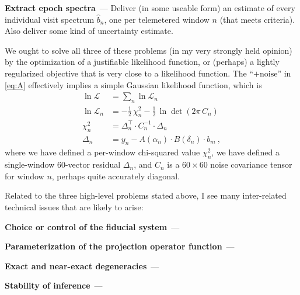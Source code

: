 \documentclass[11pt]{article}
\renewcommand{\paragraph}[1]{\medskip\par\noindent\textbf{#1}~---}
\begin{document}
\paragraph{Extract epoch spectra}
Deliver (in some useable form) an estimate of every individual visit spectrum $\hat{b}_n$, one per telemetered window $n$ (that meets criteria). Also deliver some kind of uncertainty estimate.

\medskip

We ought to solve all three of these problems (in my very strongly held opinion) by the optimization of a justifiable likelihood function, or (perhaps) a lightly regularized objective that is very close to a likelihood function.
The ``$+\mbox{noise}$'' in \eqref{eq:A} effectively implies a simple Gaussian likelihood function, which is
\begin{align}
    \ln\mathscr{L} &= \sum_n \ln\mathscr{L}_n \\
    \ln\mathscr{L}_n &= -\frac{1}{2}\,\chi^2_n - \frac{1}{2}\,\ln\det(2\pi\,C_n)\\
    \chi^2_n &= \Delta_n^\top\cdot C_n^{-1}\cdot \Delta_n \\
    \Delta_n &= y_n - A(\alpha_n)\cdot B(\delta_n)\cdot b_m ~,
\end{align}
where we have defined a per-window chi-squared value $\chi^2_n$,
we have defined a single-window 60-vector residual $\Delta_n$,
and $C_n$ is a $60\times 60$ noise covariance tensor for window $n$, perhaps quite accurately diagonal.

Related to the three high-level problems stated above, I see many inter-related technical issues that are likely to arise:

\paragraph{Choice or control of the fiducial system}

\paragraph{Parameterization of the projection operator function}

\paragraph{Exact and near-exact degeneracies}

\paragraph{Stability of inference}
\end{document}
